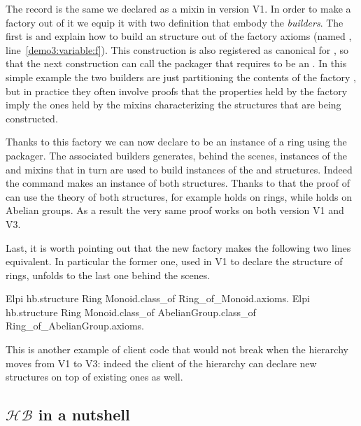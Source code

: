\documentclass[a4paper,UKenglish,cleveref, autoref]{lipics-v2019}
\newcommand{\HB}{\ensuremath{\mathcal{HB}}}
\newcommand{\mixin}{mixin}
\newcommand{\mixins}{mixins}
\newcommand{\factory}{factory}
\newcommand{\packager}{packager}
\newcommand{\builder}{builder}
\theoremstyle{implem}
\theoremstyle{implem}
\theoremstyle{axiom}
\theoremstyle{abscommand}
\theoremstyle{command}
\begin{document}
The record  is the same we declared as a \mixin{}
in version V1. In order to make a \factory{} out of it we equip it with
two definition that embody the \emph{\builder{}s}.
The first is  and
explain how to build an  structure out of the \factory{}
axioms (named , line~\ref{demo3:variable:f}).
This construction is also registered as canonical for ,
so that the next construction  can call
the  \packager{} that requires  to be
an . In this simple example the two \builder{}s are just
partitioning the contents of the \factory{} , but in practice they
often involve proofs that the properties held by the factory
imply the ones held by the \mixins{} characterizing the structures that are
being constructed.

Thanks to this \factory{} we can now declare  to be an instance
of a ring using the  \packager{}.
The associated \builder{}s generates, behind the scenes, instances of the
 and  \mixins{}
that in turn are used to build instances of the  and 
structures. Indeed the command 
makes  an instance of both structures.
Thanks to that the proof of  can use the theory of
both structures, for example  holds on rings, while  holds
on Abelian groups. As a result the very same proof works on both
version V1 and V3.

Last, it is worth pointing out that the new factory makes the following
two lines equivalent. In particular the former one, used in V1 to declare
the structure of rings, unfolds to the last one behind the scenes.

\begin{coqcode}
  Elpi hb.structure Ring Monoid.class_of Ring_of_Monoid.axioms.
  Elpi hb.structure Ring Monoid.class_of AbelianGroup.class_of Ring_of_AbelianGroup.axioms.
\end{coqcode}

This is another example of client code that would not break when the hierarchy
moves from V1 to V3: indeed the client of the hierarchy can declare new
structures on top of existing ones as well.

\subsection{\HB{} in a nutshell}
\end{document}
